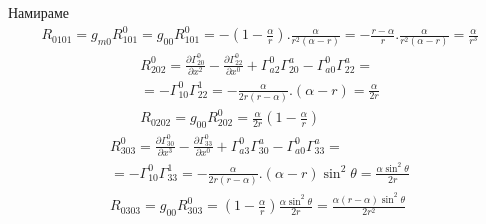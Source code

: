 \documentclass[a4paper,12pt]{article}
\begin{document}
    Намираме 
    \begin{equation*}
        \begin{aligned}
            R_{0101} = g_{m0}R^0_{101} = g_{00}R^0_{101} = -\left( 1-\frac{\alpha}{r}\right).\frac{\alpha}{r^2(\alpha -r)} = - \frac{r-\alpha}{r}.\frac{\alpha}{r^2(\alpha-r)} = \frac{\alpha}{r^3}
        \end{aligned}
    \end{equation*}
    \newline
    \begin{equation*}
        \begin{aligned}
            R^0_{202} = \frac{\partial\varGamma^0_{20}}{\partial x^2} - \frac{\partial\varGamma^0_{22}}{\partial x^0} + \varGamma^0_{a2}\varGamma^a_{20}-\varGamma^0_{a0}\varGamma^a_{22}= \\
            = -\varGamma^0_{10}\varGamma^1_{22} = -\frac{\alpha}{2r(r-\alpha)}.(\alpha-r)=\frac{\alpha}{2r}
            \\
            R_{0202}=g_{00}R^0_{202} = \frac{\alpha}{2r}\left( 1-\frac{\alpha}{r} \right)
        \end{aligned}
    \end{equation*}
    \newline
    \begin{equation*}
        \begin{aligned}
            R^0_{303} = \frac{\partial \varGamma^0_{30}}{\partial x^3} - \frac{\partial\varGamma^0_{33}}{\partial x^0} + \varGamma^0_{a3}\varGamma^a_{30} - \varGamma^0_{a0}\varGamma^a_{33} = \\
            = - \varGamma^0_ {10}\varGamma^1_{33} = -\frac{\alpha}{2r(r-\alpha)}.(\alpha-r)\sin^2\theta = \frac{\alpha\sin^2\theta}{2r}
            \\
            R_{0303}=g_{00}R^0_{303} = \left( 1- \frac{\alpha}{r} \right) \frac{\alpha\sin^2\theta}{2r} = \frac{\alpha(r-\alpha)\sin^2\theta}{2r^2}
        \end{aligned}
    \end{equation*}
    \newline
\end{document}
